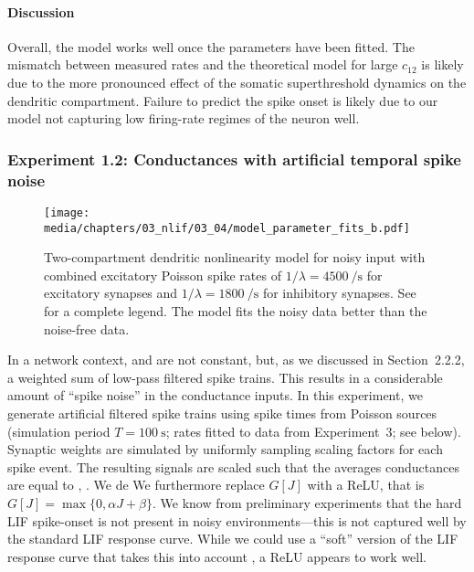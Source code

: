 \paragraph{Discussion}
Overall, the model works well once the parameters have been fitted.
The mismatch between measured rates and the theoretical model for large $c_{12}$ is likely due to the more pronounced effect of the somatic superthreshold dynamics on the dendritic compartment.
Failure to predict the spike onset is likely due to our model not capturing low firing-rate regimes of the neuron well.

\subsubsection{Experiment 1.2: Conductances with artificial temporal spike noise}

\begin{figure}[t]
	\texttt{[image: media/chapters/03\_nlif/03\_04/model\_parameter\_fits\_b.pdf]}%
	\caption[Two-compartment dendritic nonlinearity model for noisy input]{Two-compartment dendritic nonlinearity model for noisy input with combined excitatory Poisson spike rates of $1/\lambda = \SI{4500}{\per\second}$ for excitatory synapses and $1/\lambda = \SI{1800}{\per\second}$ for inhibitory synapses.
	See  for a complete legend.
	The model fits the noisy data better than the noise-free data.
	    }
	\label{fig:synaptic_nonlinearity_fit_b}%
\end{figure}

In a network context, \gE and \gI are not constant, but, as we discussed in Section~2.2.2, a weighted sum of low-pass filtered spike trains.
This results in a considerable amount of \enquote{spike noise} in the conductance inputs.
In this experiment, we generate artificial filtered spike trains using spike times from Poisson sources (simulation period $T = \SI{100}{\second}$; rates fitted to data from Experiment~3; see below).
Synaptic weights are simulated by uniformly sampling scaling factors for each spike event.
The resulting signals are scaled such that the averages conductances are equal to \gE, \gI.
We de
We furthermore replace $G[J]$ with a ReLU, that is $G[J] = \max\{ 0, \alpha J + \beta \}$.
We know from preliminary experiments that the hard LIF spike-onset is not present in noisy environments---this is not captured well by the standard LIF response curve.
While we could use a \enquote{soft} version of the LIF response curve that takes this into account \citep[cf.][]{capocelli1971diffusion,hunsberger2014competing,kreutz2015mean}, a ReLU appears to work well.

